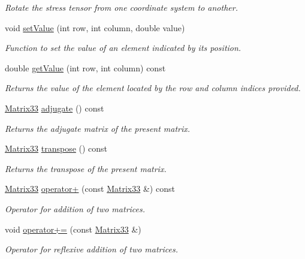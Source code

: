 \begin{DoxyCompactItemize}
\begin{DoxyCompactList}\small\item\em \-Rotate the stress tensor from one coordinate system to another. \end{DoxyCompactList}\item 
void \hyperlink{classMatrix33_a6cdcec77fd089b2e73ad7ae85ecff30b}{set\-Value} (int row, int column, double value)
\begin{DoxyCompactList}\small\item\em \-Function to set the value of an element indicated by its position. \end{DoxyCompactList}\item 
double \hyperlink{classMatrix33_ab53b3e37ad830a87a804cf26311ba088}{get\-Value} (int row, int column) const 
\begin{DoxyCompactList}\small\item\em \-Returns the value of the element located by the row and column indices provided. \end{DoxyCompactList}\item 
\hyperlink{classMatrix33}{\-Matrix33} \hyperlink{classMatrix33_a07b999a7b1c905f3c98ba3792e6fa33f}{adjugate} () const 
\begin{DoxyCompactList}\small\item\em \-Returns the adjugate matrix of the present matrix. \end{DoxyCompactList}\item 
\hyperlink{classMatrix33}{\-Matrix33} \hyperlink{classMatrix33_a64418c1a8836b38526fdfd7ffcc79cfd}{transpose} () const 
\begin{DoxyCompactList}\small\item\em \-Returns the transpose of the present matrix. \end{DoxyCompactList}\item 
\hyperlink{classMatrix33}{\-Matrix33} \hyperlink{classMatrix33_adc58ec5739c9250ff1150c725d0e868e}{operator+} (const \hyperlink{classMatrix33}{\-Matrix33} \&) const 
\begin{DoxyCompactList}\small\item\em \-Operator for addition of two matrices. \end{DoxyCompactList}\item 
void \hyperlink{classMatrix33_acb59e59d3937e075521f478ba83b7165}{operator+=} (const \hyperlink{classMatrix33}{\-Matrix33} \&)
\begin{DoxyCompactList}\small\item\em \-Operator for reflexive addition of two matrices. \end{DoxyCompactList}\item 

\end{DoxyCompactItemize}
